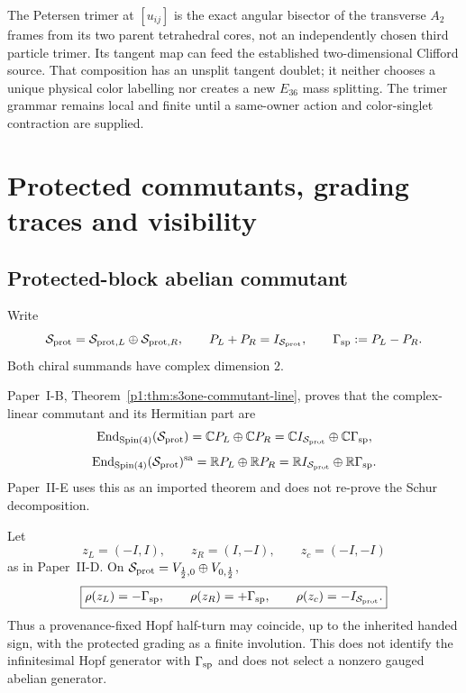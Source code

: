 \documentclass[12pt,a4paper]{article}
\begin{document}
\begin{remark}
\label{p2e:rem:v318-bisector-vs-trimer}
The Petersen trimer at $[u_{ij}]$ is the exact angular bisector of
the transverse $A_2$ frames from its two parent tetrahedral cores,
not an independently chosen third particle trimer.  Its tangent
map can feed the established two-dimensional Clifford source.
That composition has an unsplit tangent doublet; it neither chooses
a unique physical color labelling nor creates a new $E_{36}$ mass
splitting.  The trimer grammar remains local and finite until a
same-owner action and color-singlet contraction are supplied.
\end{remark}

\section{Protected commutants, grading traces and visibility}
\label{paper2e:sec:organized-contracts}
\label{paper2e:sec:organized-commutants}

\subsection{Protected-block abelian commutant}
\label{p2:sec:kin-sm-charge}
\label{p2:subsec:kin-u1}

Write
\[
\mathcal S_{\rm prot}=\mathcal S_{{\rm prot},L}\oplus\mathcal S_{{\rm prot},R},
\qquad
P_L+P_R=I_{\mathcal S_{\rm prot}},
\qquad
\Gamma_{\rm sp}:=P_L-P_R.
\]
Both chiral summands have complex dimension \(2\).

\begin{theorem}
\label{p2:prop:kin-u1-commutant}
Paper~I-B, Theorem~\ref{p1:thm:s3one-commutant-line}, proves that the
complex-linear commutant and its Hermitian part are~\cite{Kugelmann2026Paper1BExceptional}
\[
\operatorname{End}_{\mathrm{Spin}(4)}(\mathcal S_{\rm prot})
=\mathbb CP_L\oplus\mathbb CP_R
=\mathbb CI_{\mathcal S_{\rm prot}}\oplus\mathbb C\Gamma_{\rm sp},
\]
\[
\operatorname{End}_{\mathrm{Spin}(4)}(\mathcal S_{\rm prot})^{\mathrm{sa}}
=\mathbb RP_L\oplus\mathbb RP_R
=\mathbb RI_{\mathcal S_{\rm prot}}\oplus\mathbb R\Gamma_{\rm sp}.
\]
Paper~II-E uses this as an imported theorem and does not re-prove the Schur
decomposition.
\end{theorem}

\begin{corollary}
\label{p2e:cor:protected-antipodal-lifts}
Let
\[
 z_L=(-I,I),\qquad z_R=(I,-I),\qquad z_c=(-I,-I)
\]
as in Paper~II-D.  On
\(\mathcal S_{\rm prot}=V_{\frac12,0}\oplus V_{0,\frac12}\),
\[
 \boxed{\rho(z_L)=-\Gamma_{\rm sp},\qquad
        \rho(z_R)=+\Gamma_{\rm sp},\qquad
        \rho(z_c)=-I_{\mathcal S_{\rm prot}}.}
\]
Thus a provenance-fixed Hopf half-turn may coincide, up to the inherited
handed sign, with the protected grading as a finite involution.  This does not
identify the infinitesimal Hopf generator with \(\Gamma_{\rm sp}\) and does
not select a nonzero gauged abelian generator.
\end{corollary}
\end{document}
